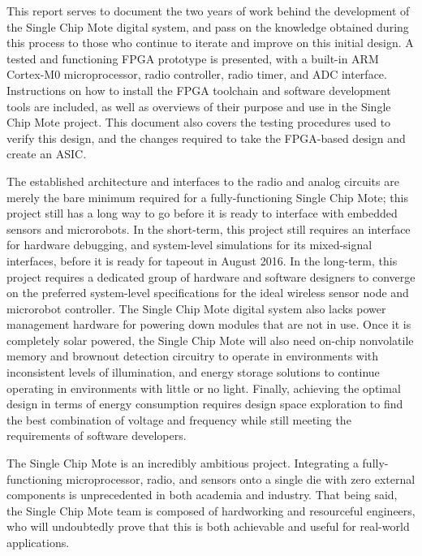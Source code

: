 This report serves to document the two years of work behind the development of the Single Chip Mote digital system, and pass on the knowledge obtained during this process to those who continue to iterate and improve on this initial design. A tested and functioning FPGA prototype is presented, with a built-in ARM Cortex-M0 microprocessor, radio controller, radio timer, and ADC interface. Instructions on how to install the FPGA toolchain and software development tools are included, as well as overviews of their purpose and use in the Single Chip Mote project. This document also covers the testing procedures used to verify this design, and the changes required to take the FPGA-based design and create an ASIC.

The established architecture and interfaces to the radio and analog circuits are merely the bare minimum required for a fully-functioning Single Chip Mote; this project still has a long way to go before it is ready to interface with embedded sensors and microrobots. In the short-term, this project still requires an interface for hardware debugging, and system-level simulations for its mixed-signal interfaces, before it is ready for tapeout in August 2016. In the long-term, this project requires a dedicated group of hardware and software designers to converge on the preferred system-level specifications for the ideal wireless sensor node and microrobot controller. The Single Chip Mote digital system also lacks power management hardware for powering down modules that are not in use. Once it is completely solar powered, the Single Chip Mote will also need on-chip nonvolatile memory and brownout detection circuitry to operate in environments with inconsistent levels of illumination, and energy storage solutions to continue operating in environments with little or no light. Finally, achieving the optimal design in terms of energy consumption requires design space exploration to find the best combination of voltage and frequency while still meeting the requirements of software developers.

The Single Chip Mote is an incredibly ambitious project. Integrating a fully-functioning microprocessor, radio, and sensors onto a single die with zero external components is unprecedented in both academia and industry. That being said, the Single Chip Mote team is composed of hardworking and resourceful engineers, who will undoubtedly prove that this is both achievable and useful for real-world applications. 